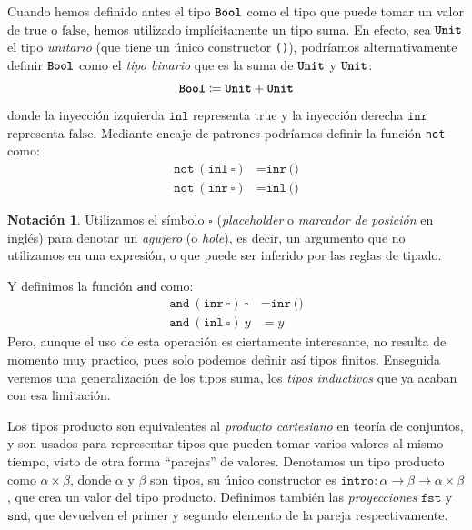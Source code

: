 \documentclass[
  a4paper, 
  10pt, 
  parskip=half, 
  toc=bibliography,
]{scrbook}
\theoremstyle{definition}
\theoremstyle{bolddef}
\newtheorem{notation}[theorem]{Notación}
\newcommand{\funfont}[1]{\texttt{#1}}
\newcommand{\tyfont}[1]{\texttt{\textbf{#1}}}
\newcommand{\placeholder}{\square}
\newcommand{\LeanTrue}{\text{true}}
\newcommand{\LeanFalse}{\text{false}}
\begin{document}
Cuando hemos definido antes el tipo \(\tyfont{Bool}\) como
el tipo que puede tomar un valor de \(\LeanTrue\) o \(\LeanFalse\), hemos
utilizado implícitamente un tipo suma. En efecto, sea \(\tyfont{Unit}\) el tipo
\emph{unitario} (que tiene un único constructor \texttt{()}), podríamos alternativamente definir 
\(\tyfont{Bool}\) como el \emph{tipo binario} que es la suma de \(\tyfont{Unit}\) y
\(\tyfont{Unit}\):
\[
  \tyfont{Bool} \coloneqq \tyfont{Unit} + \tyfont{Unit}
\]
donde la inyección izquierda \(\funfont{inl}\) representa \(\LeanTrue\) y la
inyección derecha \(\funfont{inr}\) representa \(\LeanFalse\).
Mediante encaje de patrones podríamos definir la función \texttt{not} como:
\begin{align*}
  \funfont{not} \ (\funfont{inl} \ \placeholder) &= \funfont{inr} \ \texttt{()} \\
  \funfont{not} \ (\funfont{inr} \ \placeholder) &= \funfont{inl} \ \texttt{()}
\end{align*}

\begin{notation}
  Utilizamos el símbolo \(\placeholder\) (\emph{placeholder} o \emph{marcador de
  posición} en inglés) para denotar un \emph{agujero} (o \emph{hole}), es decir, un argumento que no
  utilizamos en una expresión, o que puede ser inferido por las reglas de tipado.
\end{notation}

Y definimos la función \texttt{and} como:
\begin{align*}
  \funfont{and} \ (\funfont{inr} \ \placeholder) \ \placeholder &= \funfont{inr} \ \texttt{()} \\
  \funfont{and} \ (\funfont{inl} \ \placeholder) \ y &= y
\end{align*}
Pero, aunque el uso de esta operación es ciertamente interesante, no resulta de momento muy practico,
pues solo podemos definir así tipos finitos. Enseguida veremos una generalización de los 
tipos suma, los \emph{tipos inductivos} que ya acaban con esa limitación.

Los tipos producto son equivalentes al \emph{producto cartesiano} en teoría de
conjuntos, y son usados para representar tipos que pueden tomar varios valores
al mismo tiempo, visto de otra forma \enquote{parejas} de valores. Denotamos un tipo
producto como \(\alpha \times \beta\), donde \(\alpha\) y \(\beta\) son tipos, su
único constructor es \(\funfont{intro}: \alpha \to \beta \to \alpha \times \beta\), 
que crea un valor del tipo producto.
Definimos también las \emph{proyecciones} \(\funfont{fst}\) y
\(\funfont{snd}\), que devuelven el primer y segundo elemento de la pareja
respectivamente.
\end{document}
